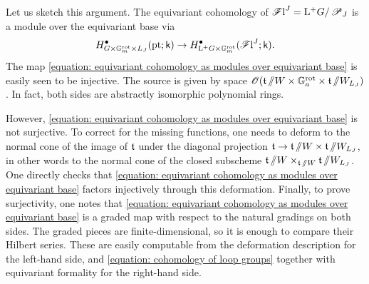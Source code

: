 Let us sketch this argument.
The equivariant cohomology of $\operatorname{\mathscr{F}l}^{J} = \mathrm{L^+} G / \operatorname{\mathscr{P}}_{J}$ is a module over the equivariant base via
\begin{equation}\label{equation: equivariant cohomology as modules over equivariant base}
    H^{\bullet}_{G \times \mathbb{G}_m^{\mathrm{rot}} \times L_{J}}(\operatorname{pt}; \mathsf{k}) \to H^{\bullet}_{\mathrm{L^+} G \times \mathbb{G}_m^{\mathrm{rot}}}(\operatorname{\mathscr{F}l}^{J}; \mathsf{k}).
\end{equation}
The map \eqref{equation: equivariant cohomology as modules over equivariant base} is easily seen to be injective. The source is given by space $\operatorname{\mathscr{O}}(\operatorname{\mathfrak{t}} \sslash W \times \mathbb{G}_a^{\mathrm{rot}} \times \operatorname{\mathfrak{t}} \sslash W_{L_J})$. In fact, both sides are abstractly isomorphic polynomial rings.

However, \eqref{equation: equivariant cohomology as modules over equivariant base} is not surjective. To correct for the missing functions, one needs to deform to the normal cone of the image of $\operatorname{\mathfrak{t}}$  under the diagonal projection $\operatorname{\mathfrak{t}} \to \operatorname{\mathfrak{t}} \sslash W \times \operatorname{\mathfrak{t}} \sslash W_{L_J}$, in other words to the normal cone of the closed subscheme $\operatorname{\mathfrak{t}} \sslash W \times_{\operatorname{\mathfrak{t}} \sslash W} \operatorname{\mathfrak{t}} \sslash W_{L_J}$.
One directly checks that \eqref{equation: equivariant cohomology as modules over equivariant base} factors injectively through this deformation.
Finally, to prove surjectivity, one notes that \eqref{equation: equivariant cohomology as modules over equivariant base} is a graded map with respect to the natural gradings on both sides. The graded pieces are finite-dimensional, so it is enough to compare their Hilbert series. These are easily computable from the deformation description for the left-hand side, and \eqref{equation: cohomology of loop groups} together with equivariant formality for the right-hand side.


